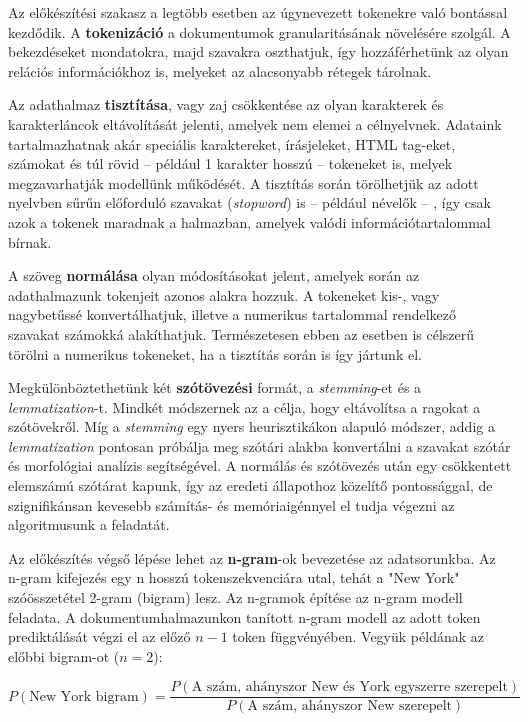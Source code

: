 Az előkészítési szakasz a legtöbb esetben az úgynevezett tokenekre való bontással kezdődik. A \textbf{tokenizáció} a dokumentumok granularitásának növelésére szolgál. A bekezdéseket mondatokra, majd szavakra oszthatjuk, így hozzáférhetünk az olyan relációs információkhoz is, melyeket az alacsonyabb rétegek tárolnak.

Az adathalmaz \textbf{tisztítása}, vagy zaj csökkentése az olyan karakterek és karakterláncok eltávolítását jelenti, amelyek nem elemei a célnyelvnek. Adataink tartalmazhatnak akár speciális karaktereket, írásjeleket, HTML tag-eket, számokat és túl rövid – például 1 karakter hosszú – tokeneket is, melyek megzavarhatják modellünk működését. A tisztítás során törölhetjük az adott nyelvben sűrűn előforduló szavakat (\textit{stopword}) is – például névelők – , így csak azok a tokenek maradnak a halmazban, amelyek valódi információtartalommal bírnak.

A szöveg \textbf{normálása} olyan módosításokat jelent, amelyek során az adathalmazunk tokenjeit azonos alakra hozzuk. A tokeneket kis-, vagy nagybetűssé konvertálhatjuk, illetve a numerikus tartalommal rendelkező szavakat számokká alakíthatjuk. Természetesen ebben az esetben is célszerű törölni a numerikus tokeneket, ha a tisztítás során is így jártunk el.

Megkülönböztethetünk két \textbf{szótövezési} formát, a \textit{stemming}-et és a \textit{lemmatization}-t. Mindkét módszernek az a célja, hogy eltávolítsa a ragokat a szótövekről. Míg a \textit{stemming} egy nyers heurisztikákon alapuló módszer, addig a \textit{lemmatization} pontosan próbálja meg szótári alakba konvertálni a szavakat szótár és morfológiai analízis segítségével. A normálás és szótövezés után egy csökkentett elemszámú szótárat kapunk, így az eredeti állapothoz közelítő pontossággal, de szignifikánsan kevesebb számítás- és memóriaigénnyel el tudja végezni az algoritmusunk a feladatát.

Az előkészítés végső lépése lehet az \textbf{n-gram}-ok bevezetése az adatsorunkba. Az n-gram kifejezés egy n hosszú tokenszekvenciára utal, tehát a "New York" szóösszetétel 2-gram (bigram) lesz. Az n-gramok építése az n-gram modell feladata. A dokumentumhalmazunkon tanított n-gram modell az adott token prediktálását végzi el az előző $n-1$ token függvényében. Vegyük példának az előbbi bigram-ot ($n=2$):

\begin{equation}
\label{eq:n-grams}
P(\text{New York bigram}) = \frac{P(\text{A szám, ahányszor New és York egyszerre szerepelt})}{P(\text{A szám, ahányszor New szerepelt})}
\end{equation}

